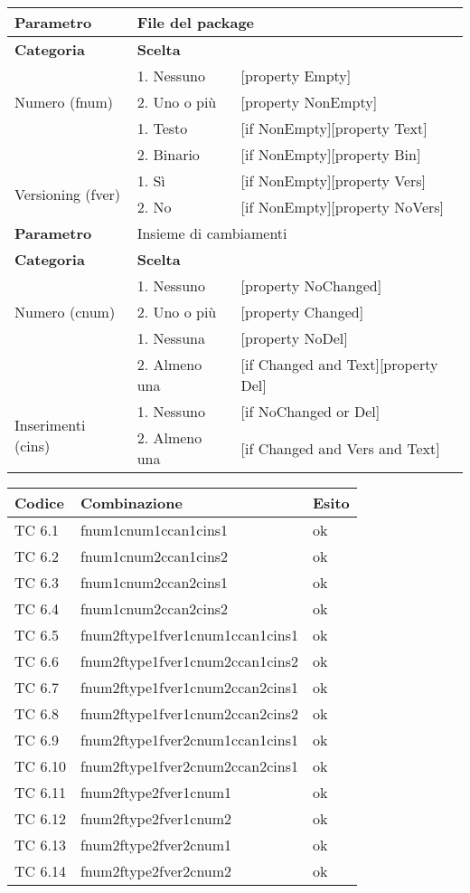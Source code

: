 \begin{tabular}{|p{4cm}|p{4cm}p{5cm}|}
	\hline
	\cellcolor{Gray} \textbf{Parametro}				& \multicolumn{2}{l|}{File del package}							\tabularnewline
	\hline
	\rowcolor{Gray}
	\textbf{Categoria}						& \textbf{Scelta}			&						\tabularnewline
	\hline
	\multirow{3}{*}{Numero (fnum)}					& 1. Nessuno				&	[property Empty] 			\tabularnewline
									\cline{2-3}
									& 2. Uno o più				&	[property NonEmpty]			\tabularnewline
	\hline
	\multirow{2}{*}{Tipo (ftype)}					& 1. Testo				&	[if NonEmpty][property Text] 		\tabularnewline
									\cline{2-3}
									& 2. Binario				&	[if NonEmpty][property Bin]		\tabularnewline
	\hline
	\multirow{2}{*}{Versioning (fver)}				& 1. Sì					&	[if NonEmpty][property Vers] 		\tabularnewline
									\cline{2-3}
									& 2. No					&	[if NonEmpty][property NoVers]		\tabularnewline
	\hline
	
	\cellcolor{Gray} \textbf{Parametro}				& \multicolumn{2}{l|}{Insieme di cambiamenti}						\tabularnewline
	\hline
	\rowcolor{Gray}
	\textbf{Categoria}						& \textbf{Scelta}			&						\tabularnewline
	\hline
	\multirow{3}{*}{Numero (cnum)}					& 1. Nessuno				&	[property NoChanged] 			\tabularnewline
									\cline{2-3}
									& 2. Uno o più				&	[property Changed]			\tabularnewline
	\hline
	\multirow{2}{*}{Cancellazioni (ccan)}				& 1. Nessuna				&	[property NoDel]			\tabularnewline
									\cline{2-3}
									& 2. Almeno una				&	[if Changed and Text][property Del]		\tabularnewline
	\hline
	\multirow{2}{*}{Inserimenti (cins)}				& 1. Nessuno				&	[if NoChanged or Del]			\tabularnewline
									\cline{2-3}
									& 2. Almeno una				&	[if Changed and Vers and Text] 		\tabularnewline
									
	\hline
	
	\hline
\end{tabular}

\vspace{1cm}

\begin{tabular}{|p{3cm}|p{7cm}|p{3cm}|}
	\hline
	\rowcolor{Gray}
	\textbf{Codice} & \textbf{Combinazione} & \textbf{Esito}\tabularnewline
	\hline
	TC 6.1			& fnum1cnum1ccan1cins1					& ok \tabularnewline
	\hline
	TC 6.2			& fnum1cnum2ccan1cins2					& ok \tabularnewline
	\hline
	TC 6.3			& fnum1cnum2ccan2cins1					& ok \tabularnewline
	\hline
	TC 6.4			& fnum1cnum2ccan2cins2					& ok \tabularnewline
	\hline
	TC 6.5			& fnum2ftype1fver1cnum1ccan1cins1			& ok \tabularnewline
	\hline
	TC 6.6			& fnum2ftype1fver1cnum2ccan1cins2			& ok \tabularnewline
	\hline
	TC 6.7			& fnum2ftype1fver1cnum2ccan2cins1			& ok \tabularnewline
	\hline
	TC 6.8			& fnum2ftype1fver1cnum2ccan2cins2			& ok \tabularnewline
	\hline
	TC 6.9			& fnum2ftype1fver2cnum1ccan1cins1			& ok \tabularnewline
	\hline
	TC 6.10			& fnum2ftype1fver2cnum2ccan2cins1			& ok \tabularnewline
	\hline
	TC 6.11			& fnum2ftype2fver1cnum1					& ok \tabularnewline
	\hline
	TC 6.12			& fnum2ftype2fver1cnum2					& ok \tabularnewline
	\hline
	TC 6.13			& fnum2ftype2fver2cnum1					& ok \tabularnewline
	\hline
	TC 6.14			& fnum2ftype2fver2cnum2					& ok \tabularnewline
	\hline
\end{tabular}
\clearpage




